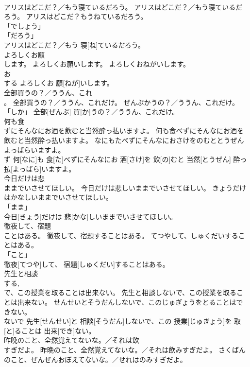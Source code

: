\documentclass[8pt]{extreport}
\begin{document}
\begin{CJK}{UTF8}{min}
\\	アリスはどこだ？／もう寝ているだろう。	アリスはどこだ？／もう寝ているだろう。	アリスはどこだ？もうねているだろう。	
\\	「でしょう」 
\\	「だろう」 
\\	アリスはどこだ？／もう 寝[ね]ているだろう。		
\\	よろしくお願
\\	します。	よろしくお願いします。	よろしくおねがいします。	
\\	お 
\\	する	よろしくお 願[ねが]いします。		
\\	全部買うの？／ううん、これ
\\	。	全部買うの？／ううん、これだけ。	ぜんぶかうの？／ううん、これだけ。	
\\	「しか」	全部[ぜんぶ] 買[か]うの？／ううん、これだけ。		
\\	何も食
\\	ずにそんなにお酒を飲むと当然酔っ払いますよ。	何も食べずにそんなにお酒を飲むと当然酔っ払いますよ。	なにもたべずにそんなにおさけをのむととうぜんよっぱらいますよ。	
\\	ず	何[なに]も 食[た]べずにそんなにお 酒[さけ]を 飲[の]むと 当然[とうぜん] 酔っ払[よっぱら]いますよ。		
\\	今日だけは悲
\\	ままでいさせてほしい。	今日だけは悲しいままでいさせてほしい。	きょうだけはかなしいままでいさせてほしい。	
\\	「まま」 
\\	今日[きょう]だけは 悲[かな]しいままでいさせてほしい。		
\\	徹夜して、宿題
\\	ことはある。	徹夜して、宿題することはある。	てつやして、しゅくだいすることはある。	
\\	「こと」 
\\	徹夜[てつや]して、 宿題[しゅくだい]することはある。		
\\	先生と相談
\\	する, 
\\	で、この授業を取ることは出来ない。	先生と相談しないで、この授業を取ることは出来ない。	せんせいとそうだんしないで、このじゅぎょうをとることはできない。	
\\	ないで	先生[せんせい]と 相談[そうだん]しないで、この 授業[じゅぎょう]を 取[と]ることは 出来[でき]ない。		
\\	昨晩のこと、全然覚えてないな。／それは飲
\\	すぎだよ。	昨晩のこと、全然覚えてないな。／それは飲みすぎだよ。	さくばんのこと、ぜんぜんおぼえてないな。／せれはのみすぎだよ。	

\end{CJK}
\end{document}
